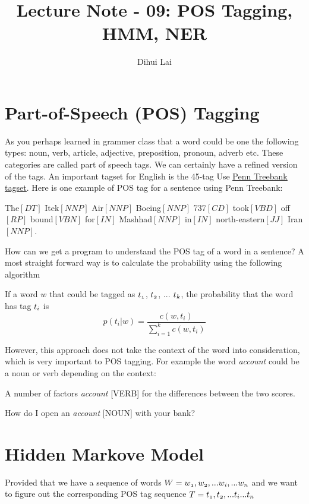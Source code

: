 \documentclass[12pt, oneside]{article}
\title{Lecture Note - 09: POS Tagging, HMM, NER}
\author{Dihui Lai}
\begin{document}
\maketitle
\tableofcontents

\vspace{.25in}

\section{Part-of-Speech (POS) Tagging}
As you perhaps learned in grammer class that a word could be one the following types: noun, verb, article, adjective, preposition, pronoun, adverb etc. These categories are called part of speech tags. We can certainly have a refined version of the tags. An important tagset for English is the 45-tag Use \href{https://www.ling.upenn.edu/courses/Fall_2003/ling001/penn_treebank_pos.html}{\underline{Penn Treebank tagset}}. Here is one example of POS tag for a sentence using Penn Treebank:

The$[DT]$ Itek$[NNP]$ Air$[NNP]$ Boeing$[NNP]$ 737$[CD]$ took$[VBD]$ off$[RP]$ bound$[VBN]$ for$[IN]$ Mashhad$[NNP]$ in$[IN]$ north-eastern$[JJ]$ Iran$[NNP]$.

How can we get a program to understand the POS tag of a word in a sentence? A most straight forward way is to calculate the probability using the following algorithm

If a word $w$ that could be tagged as $\mathnormal{t_1}$, $\mathnormal{t_2}$, ... $\mathnormal{t_k}$, the probability that the word has tag $\mathnormal{t_i}$ is
\begin{equation*}
{p(t_i|w) = \frac{c(w,t_i)}{\sum\limits_{i=1}^{k}c(w, t_i)}}
\end{equation*}

However, this approach does not take the context of the word into consideration, which is very important to POS tagging. For example the word \textit{account} could be a noun or verb depending on the context: 

A number of factors \textit{account} [VERB] for the differences between the two scores.

How do I open an \textit{account} [NOUN] with your bank?


\section{Hidden Markove Model}

Provided that we have a sequence of words $\mathnormal{W=w_1, w_2,  ...w_i, ...w_n}$ and we want to figure out the corresponding POS tag sequence $\mathnormal{T= t_1, t_2, ... t_i ...t_n}$
\end{document}
